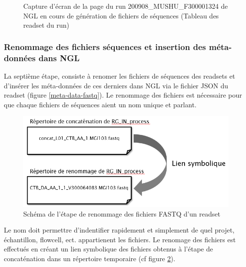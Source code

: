 \begin{figure}[H]
    \centering
    \caption{\footnotesize{Capture d'écran de la page du run 200908\_MUSHU\_F300001324 de NGL en cours de génération de fichiers de séquences (Tableau des readset du run)}}
    \label{NGL-screenshot_tab-run-readset}
\end{figure}

\subsubsection*{Renommage des fichiers séquences et insertion des méta-données dans NGL}
La septième étape, consiste à renomer les fichiers de séquences des readsets et d'insérer les méta-données de ces derniers dans NGL via le fichier JSON du readset (figure \ref{meta-data-fastq}).
Le renommage des fichiers est nécessaire pour que chaque fichiers de séquences aient un nom unique et \og parlant\fg{}.\\

\begin{minipage}{0.45\textwidth}
    \begin{figure}[H]
        \centering
        \includegraphics[width=1\textwidth]{img/Schema-renomage-fastq.png}
        \caption{\footnotesize{Schéma de l'étape de renommage des fichiers FASTQ d'un readset}}
        \label{schema-rename-fastq}
    \end{figure}
\end{minipage}
\hfill
\begin{minipage}{0.45\textwidth}
    Le nom doit permettre d'indentifier rapidement et simplement de quel projet, échantillon, flowcell, ect.
    appartienent les fichiers.
    Le renomage des fichiers est effectués en créant un lien symbolique des fichiers obtenus à l'étape de \og concaténation\fg{} dans un répertoire temporaire (cf figure \ref{schema-rename-fastq}).
\end{minipage}\\\\


